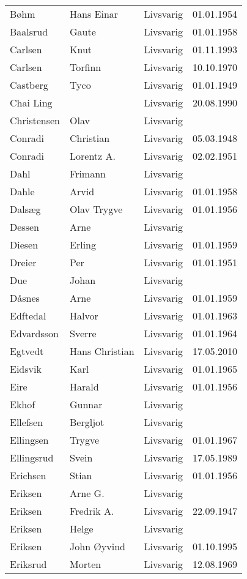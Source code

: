 \begin{longtable}{llll}
Bøhm	&	Hans Einar	&	Livsvarig 	&	01.01.1954	\\
Baalsrud	&	Gaute	&	Livsvarig 	&	01.01.1958	\\
Carlsen	&	Knut	&	Livsvarig 	&	01.11.1993	\\
Carlsen	&	Torfinn	&	Livsvarig 	&	10.10.1970	\\
Castberg	&	Tyco	&	Livsvarig 	&	01.01.1949	\\
Chai Ling	&		&	Livsvarig 	&	20.08.1990	\\
Christensen	&	Olav	&	Livsvarig 	&		\\
Conradi	&	Christian	&	Livsvarig 	&	05.03.1948	\\
Conradi	&	Lorentz A.	&	Livsvarig 	&	02.02.1951	\\
Dahl	&	Frimann	&	Livsvarig 	&		\\
Dahle	&	Arvid	&	Livsvarig 	&	01.01.1958	\\
Dalsæg	&	Olav Trygve	&	Livsvarig 	&	01.01.1956	\\
Dessen	&	Arne	&	Livsvarig 	&		\\
Diesen	&	Erling	&	Livsvarig 	&	01.01.1959	\\
Dreier	&	Per	&	Livsvarig 	&	01.01.1951	\\
Due	&	Johan	&	Livsvarig 	&		\\
Dåsnes	&	Arne	&	Livsvarig 	&	01.01.1959	\\
Edftedal	&	Halvor	&	Livsvarig 	&	01.01.1963	\\
Edvardsson	&	Sverre	&	Livsvarig 	&	01.01.1964	\\
Egtvedt	&	Hans Christian	&	Livsvarig	&	17.05.2010	\\
Eidsvik	&	Karl	&	Livsvarig 	&	01.01.1965	\\
Eire	&	Harald	&	Livsvarig 	&	01.01.1956	\\
Ekhof	&	Gunnar	&	Livsvarig 	&		\\
Ellefsen	&	Bergljot	&	Livsvarig 	&		\\
Ellingsen	&	Trygve	&	Livsvarig 	&	01.01.1967	\\
Ellingsrud	&	Svein	&	Livsvarig 	&	17.05.1989	\\
Erichsen	&	Stian	&	Livsvarig 	&	01.01.1956	\\
Eriksen	&	Arne G.	&	Livsvarig 	&		\\
Eriksen	&	Fredrik A.	&	Livsvarig 	&	22.09.1947	\\
Eriksen	&	Helge	&	Livsvarig 	&		\\
Eriksen 	&	John Øyvind	&	Livsvarig	&	01.10.1995	\\
Eriksrud	&	Morten	&	Livsvarig 	&	12.08.1969	\\

\end{longtable}
